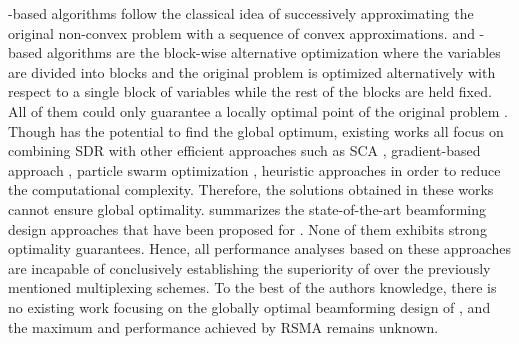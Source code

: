 \documentclass[a4paper,10pt,journal]{IEEEtran}
\begin{document}
-based algorithms follow the classical idea of successively approximating the original non-convex problem with a sequence of convex approximations.  
 and -based algorithms are the block-wise alternative optimization where the variables are divided into  blocks and the original problem is optimized alternatively with respect to a single block of variables while the rest of the blocks are held fixed.
All of them could only guarantee a locally optimal point of the original problem \cite{razaviyayn2014SCA}.
Though  has the potential to find the global optimum, existing works all focus on combining SDR with other efficient approaches such as SCA \cite{fuhao2020secrecyRS,wonjae2021imperfectCSIR},  gradient-based approach \cite{RSswiptIC2019CL}, particle swarm optimization  \cite{Camana2020swiptRS},  heuristic approaches \cite{Medra2018SPAWC}  in order to reduce the computational complexity. 
Therefore, the solutions obtained in these works cannot ensure global optimality.
  summarizes the state-of-the-art beamforming design approaches that have been proposed for .
None of them exhibits strong optimality guarantees. 
Hence, all performance analyses based on these approaches are incapable of conclusively establishing the superiority of  over the previously mentioned multiplexing schemes.
To the best of the authors knowledge, there is no existing work focusing on the globally optimal beamforming design of , and the maximum  and  performance achieved by RSMA remains unknown.
\end{document}
